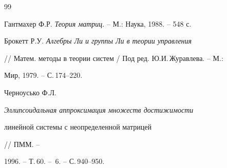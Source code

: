 \begin{thebibliography}{99}


Гантмахер Ф.Р. {\em Теория матриц}. -- М.: Наука, 1988. -- 548 с. 




Брокетт Р.У. {\em Алгебры Ли и группы Ли в теории управления} 


// Матем. методы в теории систем / Под ред. Ю.И.\,Журавлева. -- М.: 


Мир, 1979. -- С.\,174--220. 




Черноусько Ф.Л. {\em Эллипсоидальная аппроксимация множеств достижимости 


линейной системы с неопределенной матрицей} // ПММ. -- 


1996. -- Т.\,60. -- \No\,6. -- С.\,940--950. 


 


\end{thebibliography} 


 


\vskip 2cm 


 








 


\label{end} 


 


